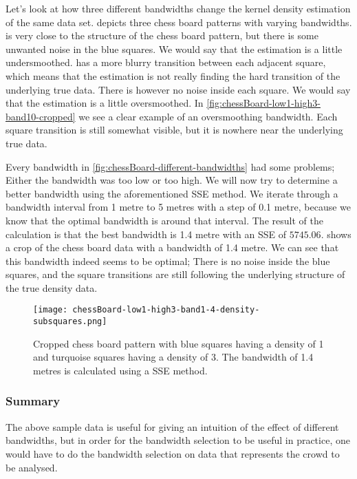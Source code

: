 Let's look at how three different bandwidths change the kernel density estimation of the same data set.  depicts three chess board patterns with varying bandwidths.  is very close to the structure of the chess board pattern, but there is some unwanted noise in the blue squares. We would say that the estimation is a little undersmoothed.  has a more blurry transition between each adjacent square, which means that the estimation is not really finding the hard transition of the underlying true data. There is however no noise inside each square. We would say that the estimation is a little oversmoothed. In \cref{fig:chessBoard-low1-high3-band10-cropped} we see a clear example of an oversmoothing bandwidth. Each square transition is still somewhat visible, but it is nowhere near the underlying true data.

Every bandwidth in \cref{fig:chessBoard-different-bandwidths} had some problems; Either the bandwidth was too low or too high. We will now try to determine a better bandwidth using the aforementioned SSE method. We iterate through a bandwidth interval from 1 metre to 5 metres with a step of 0.1 metre, because we know that the optimal bandwidth is around that interval. The result of the calculation is that the best bandwidth is 1.4 metre with an SSE of $5745.06$.  shows a crop of the chess board data with a bandwidth of 1.4 metre. We can see that this bandwidth indeed seems to be optimal; There is no noise inside the blue squares, and the square transitions are still following the underlying structure of the true density data.

\begin{figure}[htbp]
\centering
\texttt{[image: chessBoard-low1-high3-band1-4-density-subsquares.png]}
\caption[Analysed chess board pattern with bandwidth 1.4]{Cropped chess board pattern with blue squares having a density of 1 and turquoise squares having a density of 3. The bandwidth of 1.4 metres is calculated using a SSE method.}
\label{fig:chessBoard-low1-high3-band1.4-cropped}
\end{figure}

\subsubsection{Summary}

The above sample data is useful for giving an intuition of the effect of different bandwidths, but in order for the bandwidth selection to be useful in practice, one would have to do the bandwidth selection on data that represents the crowd to be analysed.